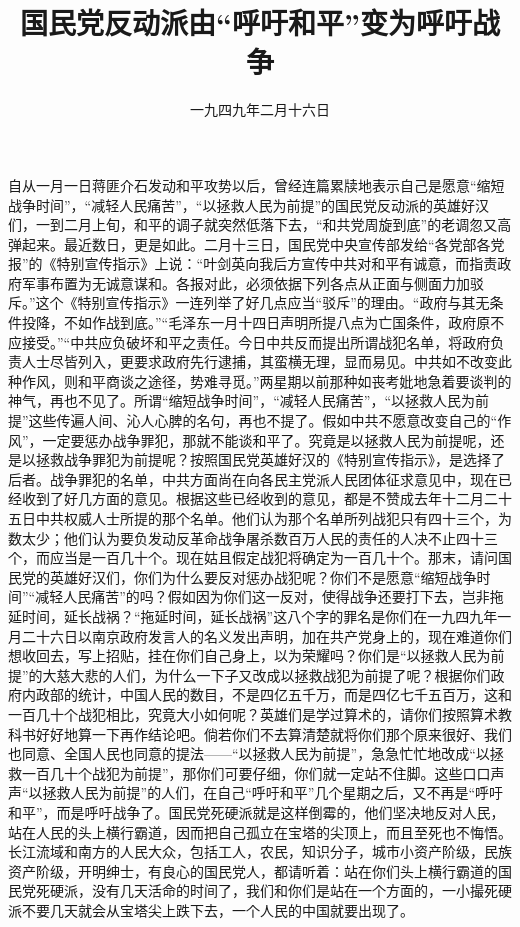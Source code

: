 
\title{国民党反动派由“呼吁和平”变为呼吁战争}
\date{一九四九年二月十六日}
\maketitle


自从一月一日蒋匪介石发动和平攻势以后，曾经连篇累牍地表示自己是愿意“缩短战争时间”，“减轻人民痛苦”，“以拯救人民为前提”的国民党反动派的英雄好汉们，一到二月上旬，和平的调子就突然低落下去，“和共党周旋到底”的老调忽又高弹起来。最近数日，更是如此。二月十三日，国民党中央宣传部发给“各党部各党报”的《特别宣传指示》上说：“叶剑英向我后方宣传中共对和平有诚意，而指责政府军事布置为无诚意谋和。各报对此，必须依据下列各点从正面与侧面力加驳斥。”这个《特别宣传指示》一连列举了好几点应当“驳斥”的理由。“政府与其无条件投降，不如作战到底。”“毛泽东一月十四日声明所提八点为亡国条件，政府原不应接受。”“中共应负破坏和平之责任。今日中共反而提出所谓战犯名单，将政府负责人士尽皆列入，更要求政府先行逮捕，其蛮横无理，显而易见。中共如不改变此种作风，则和平商谈之途径，势难寻觅。”两星期以前那种如丧考妣地急着要谈判的神气，再也不见了。所谓“缩短战争时间”，“减轻人民痛苦”，“以拯救人民为前提”这些传遍人间、沁人心脾的名句，再也不提了。假如中共不愿意改变自己的“作风”，一定要惩办战争罪犯，那就不能谈和平了。究竟是以拯救人民为前提呢，还是以拯救战争罪犯为前提呢？按照国民党英雄好汉的《特别宣传指示》，是选择了后者。战争罪犯的名单，中共方面尚在向各民主党派人民团体征求意见中，现在已经收到了好几方面的意见。根据这些已经收到的意见，都是不赞成去年十二月二十五日中共权威人士所提的那个名单。他们认为那个名单所列战犯只有四十三个，为数太少；他们认为要负发动反革命战争屠杀数百万人民的责任的人决不止四十三个，而应当是一百几十个。现在姑且假定战犯将确定为一百几十个。那末，请问国民党的英雄好汉们，你们为什么要反对惩办战犯呢？你们不是愿意“缩短战争时间”“减轻人民痛苦”的吗？假如因为你们这一反对，使得战争还要打下去，岂非拖延时间，延长战祸？“拖延时间，延长战祸”这八个字的罪名是你们在一九四九年一月二十六日以南京政府发言人的名义发出声明，加在共产党身上的，现在难道你们想收回去，写上招贴，挂在你们自己身上，以为荣耀吗？你们是“以拯救人民为前提”的大慈大悲的人们，为什么一下子又改成以拯救战犯为前提了呢？根据你们政府内政部的统计，中国人民的数目，不是四亿五千万，而是四亿七千五百万，这和一百几十个战犯相比，究竟大小如何呢？英雄们是学过算术的，请你们按照算术教科书好好地算一下再作结论吧。倘若你们不去算清楚就将你们那个原来很好、我们也同意、全国人民也同意的提法——“以拯救人民为前提”，急急忙忙地改成“以拯救一百几十个战犯为前提”，那你们可要仔细，你们就一定站不住脚。这些口口声声“以拯救人民为前提”的人们，在自己“呼吁和平”几个星期之后，又不再是“呼吁和平”，而是呼吁战争了。国民党死硬派就是这样倒霉的，他们坚决地反对人民，站在人民的头上横行霸道，因而把自己孤立在宝塔的尖顶上，而且至死也不悔悟。长江流域和南方的人民大众，包括工人，农民，知识分子，城市小资产阶级，民族资产阶级，开明绅士，有良心的国民党人，都请听着：站在你们头上横行霸道的国民党死硬派，没有几天活命的时间了，我们和你们是站在一个方面的，一小撮死硬派不要几天就会从宝塔尖上跌下去，一个人民的中国就要出现了。
